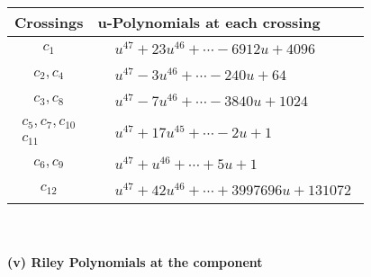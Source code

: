 \documentclass[1p]{elsarticle_modified}
\theoremstyle{definition}
\begin{document}
\begin{tabular}{m{50pt}|m{274pt}}
Crossings & \hspace{64pt}u-Polynomials at each crossing \\
\hline $$\begin{aligned}c_{1}\end{aligned}$$&$\begin{aligned}
&u^{47}+23 u^{46}+\cdots-6912 u+4096
\end{aligned}$\\
\hline $$\begin{aligned}c_{2},c_{4}\end{aligned}$$&$\begin{aligned}
&u^{47}-3 u^{46}+\cdots-240 u+64
\end{aligned}$\\
\hline $$\begin{aligned}c_{3},c_{8}\end{aligned}$$&$\begin{aligned}
&u^{47}-7 u^{46}+\cdots-3840 u+1024
\end{aligned}$\\
\hline $$\begin{aligned}c_{5},c_{7},c_{10}\\c_{11}\end{aligned}$$&$\begin{aligned}
&u^{47}+17 u^{45}+\cdots-2 u+1
\end{aligned}$\\
\hline $$\begin{aligned}c_{6},c_{9}\end{aligned}$$&$\begin{aligned}
&u^{47}+u^{46}+\cdots+5 u+1
\end{aligned}$\\
\hline $$\begin{aligned}c_{12}\end{aligned}$$&$\begin{aligned}
&u^{47}+42 u^{46}+\cdots+3997696 u+131072
\end{aligned}$\\
\hline
\end{tabular}\\~\\
\newpage\renewcommand{\arraystretch}{1}
\flushleft \textbf{(v) Riley Polynomials at the component}\newline \\
\end{document}
